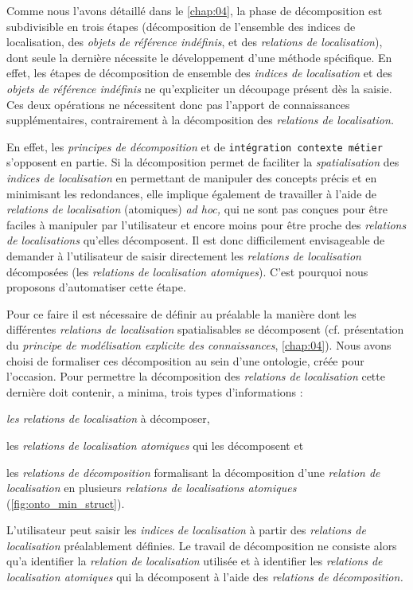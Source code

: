 Comme nous l'avons détaillé dans le \autoref{chap:04}, la phase de
décomposition est subdivisible en trois étapes (décomposition de
l'ensemble des indices de localisation, des \emph{objets de référence
  indéfinis}, et des \emph{relations de localisation}), dont seule la
dernière nécessite le développement d'une méthode spécifique. En
effet, les étapes de décomposition de ensemble des \emph{indices de
  localisation} et des \emph{objets de référence indéfinis} ne
qu'expliciter un découpage présent dès la saisie. Ces deux opérations
ne nécessitent donc pas l'apport de connaissances supplémentaires,
contrairement à la décomposition des \emph{relations de localisation.}

En effet, les \emph{principes de décomposition} et de
\texttt{intégration contexte métier} s'opposent en partie. Si la
décomposition permet de faciliter la \emph{spatialisation} des
\emph{indices de localisation} en permettant de manipuler des concepts
précis et en minimisant les redondances, elle implique également de
travailler à l'aide de \emph{relations de localisation} (atomiques)
\emph{ad hoc,} qui ne sont pas conçues pour être faciles à manipuler
par l'utilisateur et encore moins pour être proche des \emph{relations
  de localisations} qu'elles décomposent. Il est donc difficilement
envisageable de demander à l'utilisateur de saisir directement les
\emph{relations de localisation} décomposées (\ie les \emph{relations
  de localisation atomiques}). C'est pourquoi nous proposons
d'automatiser cette étape.

Pour ce faire il est nécessaire de définir au préalable la manière
dont les différentes \emph{relations de localisation} spatialisables
se décomposent (cf. présentation du \emph{principe de modélisation
  explicite des connaissances}, \autoref{chap:04}). Nous avons choisi
de formaliser ces décomposition au sein d'une ontologie, créée pour
l'occasion. Pour permettre la décomposition des \emph{relations de
  localisation} cette dernière doit contenir, a minima, trois types
d'informations :
%
\begin{enumerate*}[label=(\alph*)]
\item \emph{les relations de localisation} à décomposer,
\item les \emph{relations de localisation atomiques} qui les
  décomposent et
\item les \emph{relations de décomposition} formalisant la
  décomposition d'une \emph{relation de localisation} en plusieurs
  \emph{relations de localisations atomiques}
  (\autoref{fig:onto_min_struct}).
\end{enumerate*}
%
L'utilisateur peut saisir les \emph{indices de localisation} à partir
des \emph{relations de localisation} préalablement définies. Le
travail de décomposition ne consiste alors qu'a identifier la
\emph{relation de localisation} utilisée et à identifier les
\emph{relations de localisation atomiques} qui la décomposent à l'aide
des \emph{relations de décomposition.}


